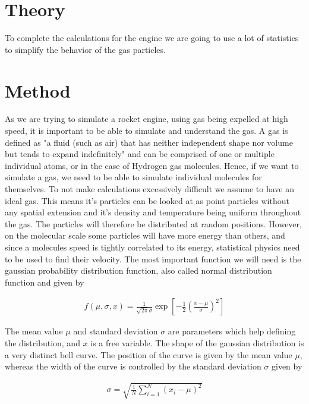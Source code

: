 \documentclass[reprint,english,notitlepage]{revtex4-2}
\begin{document}
\section{Theory}
To complete the calculations for the engine we are going to use a lot of statistics to simplify the behavior of the gas particles. 

\section{Method}
As we are trying to simulate a rocket engine, using gas being expelled at high speed, it is important to be able to simulate and understand the gas.
A gas is defined as "a fluid (such as air) that has neither independent shape nor volume but tends to expand indefinitely"
and can be comprised of one or multiple individual atoms, or in the case of Hydrogen gas molecules.
Hence, if we want to simulate a gas, we need to be able to simulate individual molecules for themselves.
To not make calculations excessively difficult we assume to have an ideal gas.
This means it's particles can be looked at as point particles without any spatial extension and it's density and temperature being uniform throughout the gas.
The particles will therefore be distributed at random positions.
However, on the molecular scale some particles will have more energy than others, and since a molecules speed is tightly correlated to its energy, statistical physics need to be used to find their velocity.
The most important function we will need is the gaussian probability distribution function, also called normal distribution function and given by

\begin{align}
    f(\mu, \sigma, x) = \frac{1}{\sqrt{2\pi}\sigma} \exp \left[-\frac{1}{2}\left(\frac{x-\mu}{\sigma}\right)^2 \right] \label{Normal_Distribution}
\end{align}

The mean value $\mu$ and standard deviation $\sigma$ are parameters which help defining the distribution, and $x$ is a free variable.
The shape of the gaussian distribution is a very distinct bell curve. The position of the curve is given by the mean value $\mu$, whereas the width of the curve is controlled by the standard deviation $\sigma$ given by

\begin{align*}
    \sigma = \sqrt{\frac{1}{N}\sum_{i = 1}^{N} \left(x_i-\mu \right)^2}
\end{align*}
\end{document}
